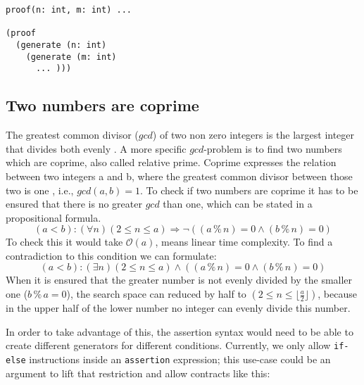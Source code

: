 \documentclass{article}
\begin{document}
\begin{lstlisting}[label=lst:proof, caption=Alternative syntax using proof or counterexample expressions]
proof(n: int, m: int) ... 

(proof
  (generate (n: int)
    (generate (m: int)
      ... )))
\end{lstlisting}

\subsection{Two numbers are coprime}\label{subsec:coprime}
The greatest common divisor ($gcd$) of two non zero integers is the largest integer that divides both evenly \cite{knuthtaocp02}. A more specific $gcd$-problem is to find two numbers which are coprime, also called relative prime. Coprime expresses the relation between two integers a and b, where the greatest common divisor between those two is one \cite{coprimewiki}, i.e., $gcd(a, b) = 1$. To check if two numbers are coprime it has to be ensured that there is no greater $gcd$ than one, which can be stated in a propositional formula.
\begin{equation}\label{eq:coprime-universial}
    (a < b): (\forall n) (2 \le n \le a) \Rightarrow \neg((a \mathbin{\%} n) = 0 \land (b \mathbin{\%} n) = 0)
\end{equation}
To check this it would take $\mathcal{O}(a)$, means linear time complexity. To find a contradiction to this condition we can formulate:
\begin{equation}\label{eq:coprime-existential}
    (a < b): (\exists n) (2 \le n \le a) \land ((a \mathbin{\%} n) = 0 \land (b \mathbin{\%} n) = 0)
\end{equation}
When it is ensured that the greater number is not evenly divided by the smaller one ($b\mathbin{\%}a=0$), the search space can reduced by half to $(2 \le n \le \lfloor \frac{a}{2} \rfloor)$, because in the upper half of the lower number no integer can evenly divide this number.

In order to take advantage of this, the assertion syntax would need to be able to create different generators for different conditions. Currently, we only allow \texttt{if-else} instructions inside an \texttt{assertion} expression; this use-case could be an argument to lift that restriction and allow contracts like this:

\end{document}

